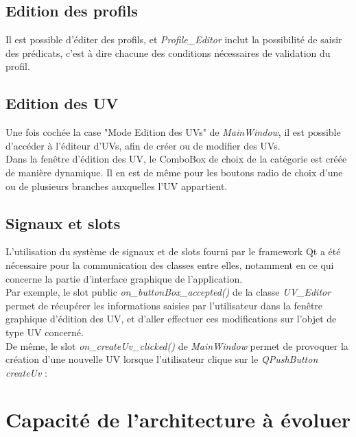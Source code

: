 \documentclass[a4paper,10pt,french]{report}
\begin{document}
	
	
		
	
    \subsection{Edition des profils}\label{subsec:Edition des profils}
        Il est possible d'éditer des profils, et \emph{Profile\_Editor} inclut la possibilité de saisir des prédicats, c'est à dire chacune des conditions nécessaires de validation du profil.
        
        
	\subsection{Edition des UV}\label{subsec:Edition des UV}
    
		Une fois cochée la case "Mode Edition des UVs" de \emph{MainWindow}, il est possible d'accéder à l'éditeur d'UVs, afin de créer ou de modifier des UVs.\\
		Dans la fenêtre d'édition des UV, le ComboBox de choix de la catégorie est créée de manière dynamique.
		Il en est de même pour les boutons radio de choix d'une ou de plusieurs branches auxquelles l'UV appartient.
        

    \subsection{Signaux et slots}\label{subsec:signaux et slots}
		L'utilisation du système de signaux et de slots fourni par le framework Qt a été nécessaire pour la communication des classes entre elles, notamment en ce qui concerne la partie d'interface graphique de l'application.\\
        Par exemple, le slot public \emph{on\_buttonBox\_accepted()} de la classe \emph{UV\_Editor} permet de récupérer les informations saisies par l'utilisateur dans la fenêtre graphique d'édition des UV, et d'aller effectuer ces modifications sur l'objet de type UV concerné.\\
        De même, le slot \emph{on\_createUv\_clicked()} de \emph{MainWindow} permet de provoquer la création d'une nouvelle UV lorsque l'utilisateur clique sur le \emph{QPushButton} \emph{createUv} : 
        
        
        
        
\section{Capacité de l'architecture à évoluer}\label{sec:II}
\end{document}
